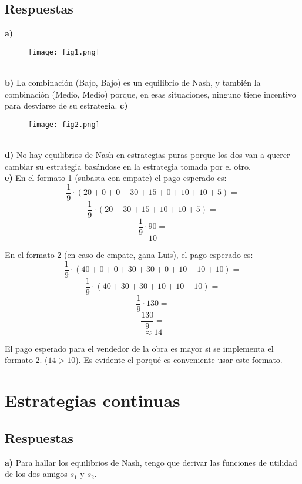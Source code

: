 \documentclass{article}
\begin{document}
        \subsection*{Respuestas}
            \textbf{a)}
                \begin{figure}[h]
                    \centering
                    \texttt{[image: fig1.png]}
                \end{figure}\\
            \textbf{b)} La combinación (Bajo, Bajo) es un equilibrio de Nash, y también la combinación (Medio, Medio) porque, en esas situaciones, ninguno tiene incentivo para desviarse de su estrategia.
            \textbf{c)}
                \begin{figure}[h]
                    \centering
                    \texttt{[image: fig2.png]}
                \end{figure}\\
            \textbf{d)} No hay equilibrios de Nash en estrategias puras porque los dos van a querer cambiar su estrategia basándose en la estrategia tomada por el otro.\\
            \textbf{e)} En el formato 1 (subasta con empate) el pago esperado es:
                \[\frac{1}{9}\cdot (20+0+0+30+15+0+10+10+5) = \]
                \[\frac{1}{9}\cdot (20+30+15+10+10+5) = \]
                \[\frac{1}{9}\cdot 90 = \]
                \[10\]

            En el formato 2 (en caso de empate, gana Luis), el pago esperado es:
                \[\frac{1}{9}\cdot (40+0+0+30+30+0+10+10+10) = \]
                \[\frac{1}{9}\cdot (40+30+30+10+10+10) = \]
                \[\frac{1}{9}\cdot 130 = \]
                \[\frac{130}{9} = \]
                \[\approx 14\]

            El pago esperado para el vendedor de la obra es mayor si se implementa el formato 2. ($14 > 10$). Es evidente el porqué es conveniente usar este formato.

    \section{Estrategias continuas}
        \subsection*{Respuestas}
            \textbf{a)} Para hallar los equilibrios de Nash, tengo que derivar las funciones de utilidad de los dos amigos $s_{1}$ y $s_{2}$.
\end{document}
